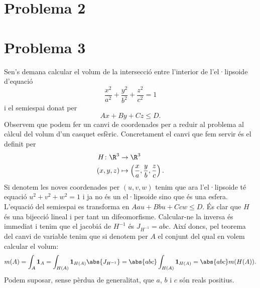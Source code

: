 \documentclass[12pt, a4paper]{article}
\begin{document}
\section*{Problema 2}



\section*{Problema 3}
Sen's demana calcular el volum de la intersecció entre l'interior de l'el·lipsoide d'equació \[ \dfrac{x^2}{a^2} + \dfrac{y^2}{b^2} + \dfrac{z^2}{c^2} = 1 \] i el semiespai donat per \[ Ax + By + Cz \leq D . \] Observem que podem fer un canvi de coordenades per a reduir al problema al càlcul del volum d'un casquet esfèric. Concretament el canvi que fem servir és el definit per 
\begin{align*}
	H \colon \R^3 & \to \R^3 \\
	(x,y,z) & \mapsto \left(\dfrac{x}{a},\dfrac{y}{b},\dfrac{z}{c}\right).
\end{align*}
Si denotem les noves coordenades per \( (u,v,w) \) tenim que ara l'el·lipsoide té equació \( u^2 + v^2 + w^2 = 1 \) i ja no és un el·lipsoide sino que és una esfera. L'equació del semiespai es transforma en \( Aau + Bbu + Ccw \leq D \). És clar que \( H \) és una bijecció lineal i per tant un difeomorfisme. Calcular-ne la inversa és immediat i tenim que el jacobiá de \( H^{-1} \) és \( J_{H^{-1}}=abc \). Així doncs, pel teorema del canvi de variable tenim que si denotem per \( A \) el conjunt del qual en volem calcular el volum:
\begin{equation}
	m(A) = \int_A \mathbf{1}_A = \int_{H(A)} \mathbf{1}_{H(A)} \abs{J_{H^{-1}}} = \abs{abc} \int_{H(A)} \mathbf{1}_{H(A)} = \abs{abc}m(H(A)). \label{eq:canvi de variables per simplificar}
\end{equation}
Podem suposar, sense pèrdua de generalitat, que \( a \), \( b \) i \( c \) són reals positius.
\end{document}
